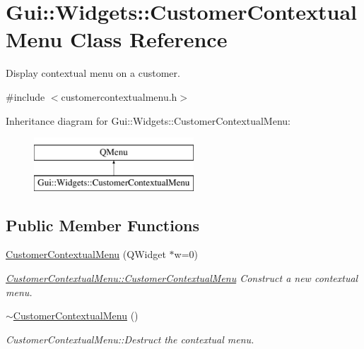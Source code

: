 \hypertarget{classGui_1_1Widgets_1_1CustomerContextualMenu}{\section{Gui\-:\-:Widgets\-:\-:Customer\-Contextual\-Menu Class Reference}
\label{classGui_1_1Widgets_1_1CustomerContextualMenu}
}


Display contextual menu on a customer.  




{\ttfamily \#include $<$customercontextualmenu.\-h$>$}

Inheritance diagram for Gui\-:\-:Widgets\-:\-:Customer\-Contextual\-Menu\-:\begin{figure}[H]
\begin{center}
\leavevmode
\includegraphics[height=2.000000cm]{d8/ded/classGui_1_1Widgets_1_1CustomerContextualMenu}
\end{center}
\end{figure}
\subsection*{Public Member Functions}
\begin{DoxyCompactItemize}
\item 
\hyperlink{classGui_1_1Widgets_1_1CustomerContextualMenu_ab8fc199bd6adf21f7dd5e881e0a73b16}{Customer\-Contextual\-Menu} (Q\-Widget $\ast$w=0)
\begin{DoxyCompactList}\small\item\em \hyperlink{classGui_1_1Widgets_1_1CustomerContextualMenu_ab8fc199bd6adf21f7dd5e881e0a73b16}{Customer\-Contextual\-Menu\-::\-Customer\-Contextual\-Menu} Construct a new contextual menu. \end{DoxyCompactList}\item 
\hypertarget{classGui_1_1Widgets_1_1CustomerContextualMenu_a6814dcf744752f9026c85a9640cf23ef}{\hyperlink{classGui_1_1Widgets_1_1CustomerContextualMenu_a6814dcf744752f9026c85a9640cf23ef}{$\sim$\-Customer\-Contextual\-Menu} ()}\label{classGui_1_1Widgets_1_1CustomerContextualMenu_a6814dcf744752f9026c85a9640cf23ef}

\begin{DoxyCompactList}\small\item\em Customer\-Contextual\-Menu\-::\-Destruct the contextual menu. \end{DoxyCompactList}\end{DoxyCompactItemize}



